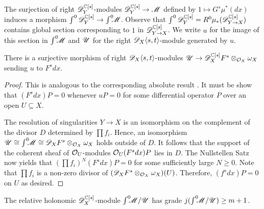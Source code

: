   The surjection of right $\mathscr{D}_Y^{\mathbb{C}[s]}$-modules $\mathscr{D}_Y^{\mathbb{C}[s]}\to \mathscr{M}$ defined by $1\mapsto G^s \mu^*(dx)$ induces a morphism $\int^{0} \mathscr{D}_Y^{\mathbb{C}[s]} \to \int^0 \mkern -8mu\mathscr{M}$.
  Observe that $\int^0 \mathscr{D}_Y^{\mathbb{C}[s]} = R^0\mu_*(\mathscr{D}_{Y\to X}^{\mathbb{C}[s]})$ contains global section corresponding to $1$ in $\mathscr{D}_{Y\to X}^{\mathbb{C}[s]}$.
  We write $u$ for the image of this section in $\int^0 \mkern -8mu \mathscr{M}$ and $\mathscr{U}$ for the right $\mathscr{D}_X\langle s,t\rangle$-module generated by $u$.
  \begin{lemma}\label{lem: SurjectionUF}
  There is a surjective morphism of right $\mathscr{D}_X\langle s,t \rangle$-modules $\mathscr{U}\to \mathscr{D}_X^{\mathbb{C}[s]}F^s \otimes_{\mathcal{O}_X}\omega_X$ sending $u$ to $F^sdx$.
\end{lemma}
\begin{proof}
  This is analogous to the corresponding absolute result .
  It must be show that $(F^s dx)P = 0$ whenever $uP = 0$ for some differential operator $P$ over an open $U\subseteq X$.

  The resolution of singularities $Y\to X$ is an isomorphism on the complement of the divisor $D$ determined by $\prod f_i$.
  Hence, an isomorphism $\mathscr{U} \cong \int^0 \mkern -8mu \mathscr{M} \cong  \mathscr{D}_X F^s  \otimes_{\mathcal{O}_X}\omega_X$ holds outside of $D$.
  It follows that the support of the coherent sheaf of $\mathcal{O}_U$-modules $\mathcal{O}_U (F^s dx) P $ lies in $D$.
  The Nullstellen Satz now yields that $(\prod f_i)^N (F^s dx) P  = 0$ for some sufficiently large $N\geq 0$.
  Note that $\prod f_i$ is a non-zero divisor of $(\mathscr{D}_X F^s\otimes_{\mathcal{O}_X} \omega_X)(U)$.
  Therefore, $(f^s dx) P= 0$ on $U$ as desired.
\end{proof}
\begin{lemma}\label{lem: GradeNPlusOne}
  The relative holonomic $\mathscr{D}_X^{\mathbb{C}[s]}$-module $\int^0 \mkern -8mu\mathscr{M}/\mathscr{U}$ has grade $j(\int^0 \mkern -8mu\mathscr{M}/\mathscr{U})\geq m+1$.
\end{lemma}
